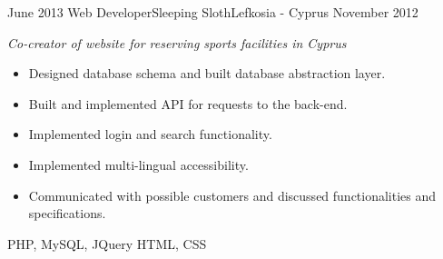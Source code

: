 \begin{experiences}
    \experience
      {June 2013}
      {Web Developer}{Sleeping Sloth}{Lefkosia - Cyprus}
      {November 2012}
      {
        \emph{Co-creator of website for reserving sports facilities in Cyprus}
        \begin{itemize}
          \item Designed database schema and built database abstraction layer.
          \item Built and implemented API for requests to the back-end.
          \item Implemented login and search functionality.
          \item Implemented multi-lingual accessibility.
          \item Communicated with possible customers and discussed functionalities and specifications.
        \end{itemize}
      }
      {PHP, MySQL, JQuery}
      {HTML, CSS}
  \end{experiences}
